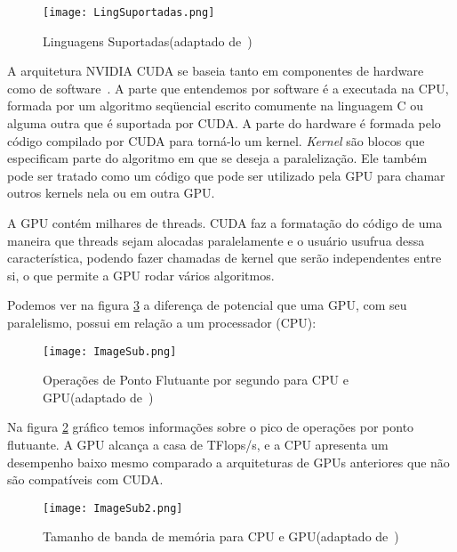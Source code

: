 \begin{figure}[htb]
	\begin{center}
	\centering
			\texttt{[image: LingSuportadas.png]}
	\label{fig: lingSuportadas}
	\caption{Linguagens Suportadas(adaptado de~\citep{cuda})}
	\end{center}
\end{figure}

A arquitetura NVIDIA CUDA se baseia tanto em componentes de hardware como de software~\citep{cuda}. A parte que entendemos por software é a executada na CPU, formada por um algoritmo seqüencial escrito comumente na linguagem C ou alguma outra que é suportada por CUDA. A parte do hardware é formada pelo código compilado por CUDA para torná-lo um kernel. \textit{Kernel} são blocos que especificam parte do algoritmo em que se deseja a
paralelização. Ele também pode ser tratado como um código que pode ser utilizado pela GPU para chamar outros kernels nela ou em outra GPU.

A GPU contém milhares de threads. CUDA faz a formatação do código de uma maneira que threads sejam alocadas paralelamente e o usuário usufrua dessa característica, podendo fazer chamadas de kernel que serão independentes entre si, o que permite a GPU rodar vários algoritmos.

Podemos ver na figura \ref{fig: graficosCuda2} a diferença de potencial que uma GPU, com seu paralelismo, possui em relação a um processador (CPU):

\begin{figure}[!htb]
	\begin{center}
	\centering
			\texttt{[image: ImageSub.png]}
	\caption{Operações de Ponto Flutuante por segundo para CPU e GPU(adaptado de~\citep{cuda})}
	\label{fig: graficosCuda1}
	\end{center}
\end{figure}

Na figura \ref{fig: graficosCuda1} gráfico temos informações sobre o pico de operações por ponto flutuante. A GPU alcança a casa de TFlops/s, e a CPU apresenta um desempenho baixo mesmo comparado a arquiteturas de GPUs anteriores que não são compatíveis com CUDA.

\begin{figure}[!htb]
	\begin{center}
	\centering
			\texttt{[image: ImageSub2.png]}
	\caption{Tamanho de banda de memória para CPU e GPU(adaptado de~\citep{cuda})}
	\label{fig: graficosCuda2}
	\end{center}
\end{figure}

